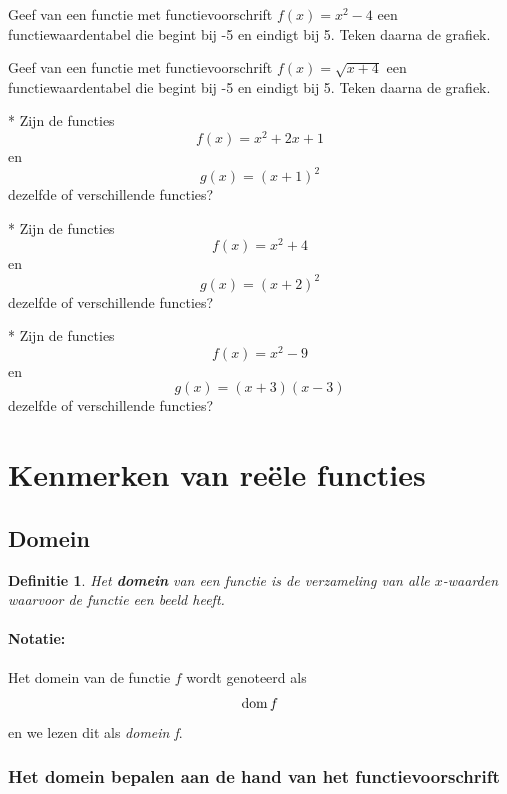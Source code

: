 \documentclass[12pt,a4paper,twoside]{article}
\newtheorem{definition}{Definitie}
\begin{document}
\begin{oefening}
  Geef van een functie met functievoorschrift $f(x)=x^2-4$ een functiewaardentabel die begint bij -5 en eindigt bij 5. Teken daarna de grafiek.
\end{oefening}

\begin{oefening}
  Geef van een functie met functievoorschrift $f(x)=\sqrt{x+4}$ een functiewaardentabel die begint bij -5 en eindigt bij 5. Teken daarna de grafiek.
\end{oefening}

\begin{oefening}*
  Zijn de functies
  $$f(x)=x^2+2x+1$$
  en
  $$g(x)=(x+1)^2$$
  dezelfde of verschillende functies?
\end{oefening}

\begin{oefening}*
  Zijn de functies
  $$f(x)=x^2+4$$
  en
  $$g(x)=(x+2)^2$$
  dezelfde of verschillende functies?
\end{oefening}

\begin{oefening}*
  Zijn de functies
  $$f(x)=x^2-9$$
  en
  $$g(x)=(x+3)(x-3)$$
  dezelfde of verschillende functies?
\end{oefening}

\cleardoublepage
\section{Kenmerken van reële functies}

\subsection{Domein}

\begin{definition}
  Het {\bf domein} van een functie is de verzameling van alle $x$-waarden waarvoor de functie een beeld heeft.
\end{definition}

\paragraph{Notatie:} Het domein van de functie $f$ wordt genoteerd als $$\dom f$$ en we lezen dit als {\em domein f}.

\subsubsection*{Het domein bepalen aan de hand van het functievoorschrift}
\end{document}
